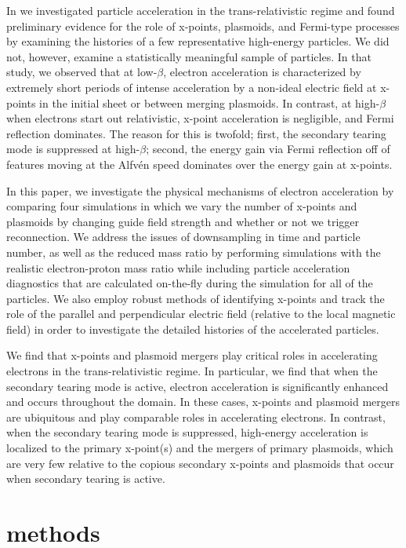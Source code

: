 \documentclass[iop,twocolappendix]{emulateapj}
\begin{document}
In \citet{ball2018} we investigated particle acceleration in the trans-relativistic regime and found preliminary evidence for the role of x-points, plasmoids, and Fermi-type processes by examining the histories of a few representative high-energy particles.  We did not, however, examine a statistically meaningful sample of particles.  In that study, we observed that at low-$\beta$, electron acceleration is characterized by extremely short periods of intense acceleration by a non-ideal electric field at x-points in the initial sheet or between merging plasmoids.  In contrast, at high-$\beta$ when electrons start out relativistic, x-point acceleration is negligible, and Fermi reflection dominates.  The reason for this is twofold; first, the secondary tearing mode is suppressed at high-$\beta$; second, the energy gain via Fermi reflection off of features moving at the Alfv\'en speed dominates over the energy gain at x-points.

In this paper, we investigate the physical mechanisms of electron acceleration by comparing four simulations in which we vary the number of x-points and plasmoids by changing guide field strength and whether or not we trigger reconnection.  We address the issues of downsampling in time and particle number, as well as the reduced mass ratio by performing simulations with the realistic electron-proton mass ratio while including particle acceleration diagnostics that are calculated on-the-fly during the simulation for all of the particles.  We also employ robust methods of identifying x-points and track the role of the parallel and perpendicular electric field (relative to the local magnetic field) in order to investigate the detailed histories of the accelerated particles.  

We find that x-points and plasmoid mergers play critical roles in accelerating electrons in the trans-relativistic regime.  In particular, we find that when the secondary tearing mode is active, electron acceleration is significantly enhanced and occurs throughout the domain.  In these cases, x-points and plasmoid mergers are ubiquitous  and play comparable roles in accelerating electrons.  In contrast, when the secondary tearing mode is suppressed, high-energy acceleration is localized to the primary x-point(s) and the mergers of primary plasmoids, which are very few relative to the copious secondary x-points and plasmoids that occur when secondary tearing is active.


\section{methods} \label{methods}
\end{document}
